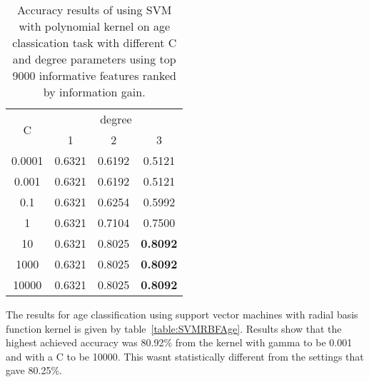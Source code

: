 \documentclass[a4paper]{llncs}
\begin{document}
\begin{table}[!htbp]
\centering
\begin{tabular}{|c|c|c|c|}
\hline
\multirow{2}{*}{C} & \multicolumn{3}{c|}{degree}       \\ \cline{2-4} 
                   & 1      & 2      & 3               \\ \hline
0.0001             & 0.6321 & 0.6192 & 0.5121          \\ \hline
0.001              & 0.6321 & 0.6192 & 0.5121          \\ \hline
0.1                & 0.6321 & 0.6254 & 0.5992          \\ \hline
1                  & 0.6321 & 0.7104 & 0.7500          \\ \hline
10                 & 0.6321 & 0.8025 & \textbf{0.8092} \\ \hline
1000               & 0.6321 & 0.8025 & \textbf{0.8092} \\ \hline
10000              & 0.6321 & 0.8025 & \textbf{0.8092} \\ \hline
\end{tabular}
\caption{Accuracy results of using SVM with polynomial kernel on age classication task with different C and degree parameters using top 9000 informative features ranked by information gain.}
\label{table:SVMPolyAge}
\end{table}

The results for age classification using support vector machines with radial basis function kernel is given by table~\ref{table:SVMRBFAge}. Results show that the highest achieved accuracy was 80.92\% from the kernel with gamma to be 0.001 and with a C to be 10000. This wasnt statistically different from the settings that gave 80.25\%.  
 
\end{document}
